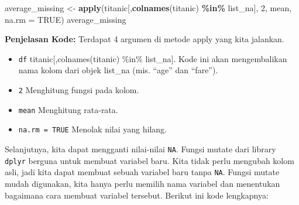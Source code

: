 \documentclass[
]{book}
\newenvironment{Shaded}{\begin{snugshade}}{\end{snugshade}}
\newcommand{\AttributeTok}[1]{\textcolor[rgb]{0.13,0.29,0.53}{#1}}
\newcommand{\ConstantTok}[1]{\textcolor[rgb]{0.56,0.35,0.01}{#1}}
\newcommand{\DecValTok}[1]{\textcolor[rgb]{0.00,0.00,0.81}{#1}}
\newcommand{\FunctionTok}[1]{\textcolor[rgb]{0.13,0.29,0.53}{\textbf{#1}}}
\newcommand{\NormalTok}[1]{#1}
\newcommand{\OtherTok}[1]{\textcolor[rgb]{0.56,0.35,0.01}{#1}}
\newcommand{\SpecialCharTok}[1]{\textcolor[rgb]{0.81,0.36,0.00}{\textbf{#1}}}
\providecommand{\tightlist}{%
  \setlength{\itemsep}{0pt}\setlength{\parskip}{0pt}}
\begin{document}
\begin{Shaded}
\begin{Highlighting}[]
\NormalTok{average\_missing }\OtherTok{\textless{}{-}} \FunctionTok{apply}\NormalTok{(titanic[,}\FunctionTok{colnames}\NormalTok{(titanic) }\SpecialCharTok{\%in\%}\NormalTok{ list\_na],}
                         \DecValTok{2}\NormalTok{,}
\NormalTok{                         mean,}
                         \AttributeTok{na.rm =}  \ConstantTok{TRUE}\NormalTok{)}
\NormalTok{average\_missing}
\end{Highlighting}
\end{Shaded}

\textbf{Penjelasan Kode:} Terdapat 4 argumen di metode apply yang kita jalankan.

\begin{itemize}
\tightlist
\item
  \texttt{df} titanic{[},colnames(titanic) \%in\% list\_na{]}. Kode ini akan mengembalikan nama kolom dari objek list\_na (mis. ``age'' dan ``fare'').
\item
  \texttt{2} Menghitung fungsi pada kolom.
\item
  \texttt{mean} Menghitung rata-rata.
\item
  \texttt{na.rm\ =\ TRUE} Menolak nilai yang hilang.
\end{itemize}

Selanjutnya, kita dapat mengganti nilai-nilai \texttt{NA}. Fungsi mutate dari library \texttt{dplyr} berguna untuk membuat variabel baru. Kita tidak perlu mengubah kolom asli, jadi kita dapat membuat sebuah variabel baru tanpa \texttt{NA}. Fungsi mutate mudah digunakan, kita hanya perlu memilih nama variabel dan menentukan bagaimana cara membuat variabel tersebut. Berikut ini kode lengkapnya:

\begin{Shaded}
\end{Shaded}
\end{document}
